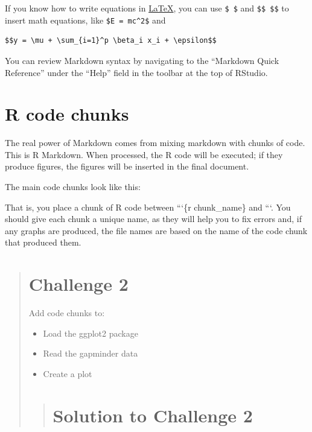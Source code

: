 \documentclass[]{book}
\providecommand{\tightlist}{%
  \setlength{\itemsep}{0pt}\setlength{\parskip}{0pt}}
\begin{document}
If you know how to write equations in
\href{http://www.latex-project.org/}{LaTeX}, you can use \texttt{\$\ \$}
and \texttt{\$\$\ \$\$} to insert math equations, like
\texttt{\$E\ =\ mc\^{}2\$} and

\begin{verbatim}
$$y = \mu + \sum_{i=1}^p \beta_i x_i + \epsilon$$
\end{verbatim}

You can review Markdown syntax by navigating to the ``Markdown Quick
Reference'' under the ``Help'' field in the toolbar at the top of
RStudio.

\section{R code chunks}\label{r-code-chunks}

The real power of Markdown comes from mixing markdown with chunks of
code. This is R Markdown. When processed, the R code will be executed;
if they produce figures, the figures will be inserted in the final
document.

The main code chunks look like this:

That is, you place a chunk of R code between ```\{r chunk\_name\} and
```. You should give each chunk a unique name, as they will help you to
fix errors and, if any graphs are produced, the file names are based on
the name of the code chunk that produced them.

\begin{quote}
\section{Challenge 2}\label{challenge-2}

Add code chunks to:

\begin{itemize}
\tightlist
\item
  Load the ggplot2 package
\item
  Read the gapminder data
\item
  Create a plot
\end{itemize}

\begin{quote}
\section{Solution to Challenge 2}\label{solution-to-challenge-2}
\end{quote}
\end{quote}
\end{document}
